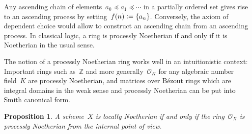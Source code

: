 \documentclass[10pt]{amsart}
\theoremstyle{definition}
\theoremstyle{plain}
\newtheorem{prop}[defn]{Proposition}
\theoremstyle{remark}
\newcommand{\ZZ}{\mathbb{Z}}
\renewcommand{\O}{\mathcal{O}}
\newcommand{\?}{\,{:}\,}
\renewcommand{\_}{\mathpunct{.}\,}
\newcommand{\defeq}{\vcentcolon=}
\begin{document}
Any ascending chain of elements~$a_0 \preceq a_1 \preceq \cdots$ in a partially
ordered set gives rise to an ascending process by setting~$f(n) \defeq \{ a_n
\}$. Conversely, the axiom of dependent choice would allow to construct an
ascending chain from an ascending process. In classical logic, a ring is
processly Noetherian if and only if it is Noetherian in the usual sense.

The notion of a processly Noetherian ring works well in an
intuitionistic context: Important rings such as~$\ZZ$ and more generally~$\O_K$
for any algebraic number field~$K$ are processly Noetherian, and matrices
over Bézout rings which are integral domains in the weak sense and
processly Noetherian can be put into Smith canonical form.

\begin{prop}A scheme~$X$ is locally Noetherian if and only if the ring~$\O_X$
is processly Noetherian from the internal point of view.\end{prop}
\end{document}
